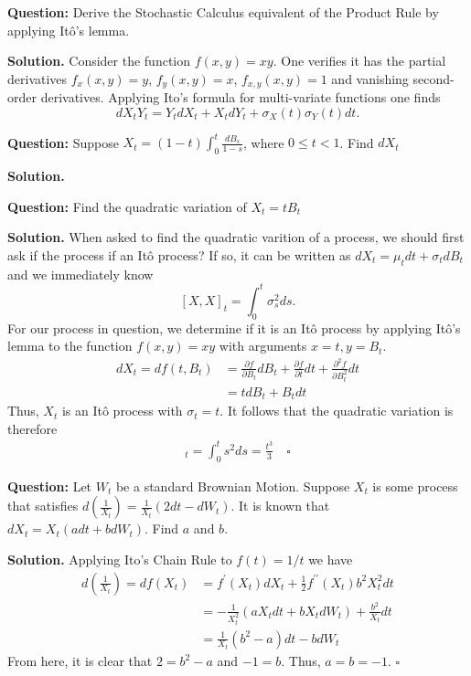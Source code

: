 \documentclass{article}
\begin{document}
\begin{tcolorbox}[colframe=black,colback=gray!5,boxrule=0.5pt]
\textbf{Question:} Derive the Stochastic Calculus equivalent of the Product Rule by applying Itô's lemma. 
\end{tcolorbox}
\textbf{Solution.} Consider the function $f(x,y) = xy$. One verifies it has the partial derivatives $f_x(x,y)=y$, $f_y(x,y)=x$, $f_{x,y}(x,y)=1$ and vanishing second-order derivatives. Applying Ito's formula for multi-variate functions one finds
$$dX_tY_t = Y_tdX_t + X_tdY_t + \sigma_X(t)\sigma_Y(t)dt.$$

\begin{tcolorbox}[colframe=black,colback=gray!5,boxrule=0.5pt]
\textbf{Question:} Suppose $X_t = (1-t)\int_0^t\frac{dB_s}{1-s}$, where $0\leq t<1$. Find $dX_t$
\end{tcolorbox}
\textbf{Solution.} 


\begin{tcolorbox}[colframe=black,colback=gray!5,boxrule=0.5pt]
\textbf{Question:} Find the quadratic variation of $X_t = tB_t$
\end{tcolorbox}
\textbf{Solution.} When asked to find the quadratic varition of a process, we should first ask if the process if an Itô process? If so, it can be written as $dX_t = \mu_t dt + \sigma_t dB_t$ and we immediately know 
$$[X, X]_t = \int_0^t\sigma_s^2ds.$$
For our process in question, we determine if it is an Itô process by applying Itô's lemma to the function $f(x,y) = xy$ with arguments $x=t, y=B_t$. 
\begin{align*}
    dX_t = df(t,B_t) &= \frac{\partial f}{\partial B_t}dB_t + \frac{\partial f}{\partial t}dt + \frac{\partial^2 f}{\partial B_t^2}dt \\
    &=tdB_t + B_tdt
\end{align*}
Thus, $X_t$ is an Itô process with $\sigma_t = t$. It follows that the quadratic variation is therefore
\begin{align*}
    [X,X]_t = \int_0^t s^2ds = \frac{t^3}{3} \quad \square
\end{align*}

\begin{tcolorbox}[colframe=black,colback=gray!5,boxrule=0.5pt]
\textbf{Question:} Let $W_t$ be a standard Brownian Motion. Suppose $X_t$ is some process that satisfies $d(\frac{1}{X_t}) = \frac{1}{X_t}(2dt-dW_t)$. It is known that $dX_t = X_t(adt + bdW_t)$. Find $a$ and $b$.
\end{tcolorbox}
\textbf{Solution.} Applying Ito's Chain Rule to $f(t) = 1/t$ we have 
\begin{align*}
    d\left(\frac{1}{X_t}\right) = df(X_t) &=  f^\prime(X_t)dX_t + \frac{1}{2}f^{\prime\prime}(X_t)b^2X_t^2dt \\
    &= -\frac{1}{X_t^2}(aX_tdt + bX_tdW_t) + \frac{b^2}{X_t}dt \\
&= \frac{1}{X_t}(b^2-a)dt-bdW_t
\end{align*}
From here, it is clear that $2 = b^2-a$ and $-1 = b$. Thus, $a=b=-1$. $\square$
\end{document}
